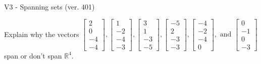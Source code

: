 \begin{exercise}
  \begin{exerciseTitle}V3 - Spanning sets (ver. 401)\end{exerciseTitle}
  \begin{exerciseStatement}
    Explain why the vectors \(\left[\begin{array}{r}
2 \\
0 \\
-4 \\
-4
\end{array}\right] , \left[\begin{array}{r}
1 \\
-2 \\
-4 \\
-3
\end{array}\right] , \left[\begin{array}{r}
3 \\
1 \\
-3 \\
-5
\end{array}\right] , \left[\begin{array}{r}
-5 \\
2 \\
-3 \\
-3
\end{array}\right] , \left[\begin{array}{r}
-4 \\
-2 \\
-4 \\
0
\end{array}\right] , \text{ and } \left[\begin{array}{r}
0 \\
-1 \\
0 \\
-3
\end{array}\right]\) span or don't span \(\mathbb{R}^4\). 
	



\end{exerciseStatement}
\end{exercise}
